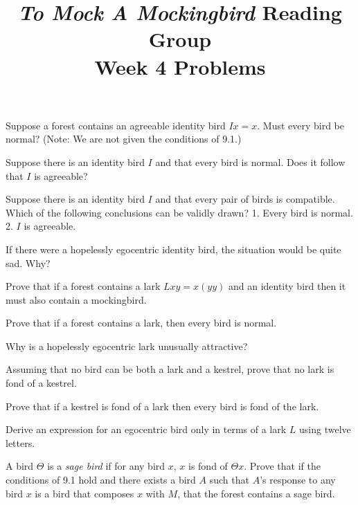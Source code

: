 \documentclass[12pt, letterpaper]{article}
\title{\emph{To Mock A Mockingbird} Reading Group\\Week 4 Problems}
\begin{document}
\maketitle

\begin{prob}{9.20}
Suppose a forest contains an agreeable identity bird $Ix = x$. Must every bird be normal? (Note: We are not given the conditions of 9.1.)
\end{prob}

\begin{prob}{9.21}
Suppose there is an identity bird $I$ and that every bird is normal. Does it follow that $I$ is agreeable?
\end{prob}

\begin{prob}{9.22}
Suppose there is an identity bird $I$ and that every pair of birds is compatible. Which of the following conclusions can be validly drawn? 1. Every bird is normal. 2. $I$ is agreeable.
\end{prob}

\begin{prob}{9.23}
If there were a hopelessly egocentric identity bird, the situation would be quite sad. Why?
\end{prob}

\begin{prob}{9.24}
Prove that if a forest contains a lark $Lxy = x(yy)$ and an identity bird then it must also contain a mockingbird.
\end{prob}

\begin{prob}{9.25}
Prove that if a forest contains a lark, then every bird is normal.
\end{prob}

\begin{prob}{9.26}
Why is a hopelessly egocentric lark unusually attractive?
\end{prob}

\begin{prob}{9.27}
Assuming that no bird can be both a lark and a kestrel, prove that no lark is fond of a kestrel.
\end{prob}

\begin{prob}{9.28}
Prove that if a kestrel is fond of a lark then every bird is fond of the lark.
\end{prob}

\begin{prob}{9.29}
Derive an expression for an egocentric bird only in terms of a lark $L$ using twelve letters.
\end{prob}

\begin{prob}{10.1}
A bird $\Theta$ is a \emph{sage bird} if for any bird $x$, $x$ is fond of $\Theta x$. Prove that if the conditions of 9.1 hold and there exists a bird $A$ such that $A$'s response to any bird $x$ is a bird that composes $x$ with $M$, that the forest contains a sage bird.
\end{prob}
\end{document}
